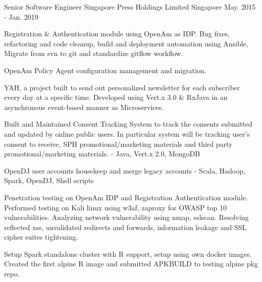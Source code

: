 \begin{cventries}
  \cventry
      {Senior Software Engineer} %
      {Singapore Press Holdings Limited} %
      {Singapore} %
      {May. 2015 - Jan. 2019} %
      { %
        \begin{cvitems}
          \item {Registration \& Authentication module using OpenAm as IDP. Bug fixes, refactoring and code cleanup, build and deployment automation using Ansible, Migrate from svn to git and standardize gitflow workflow.}
          \item {OpenAm Policy Agent configuration management and migration.}
          \item {YAH, a project built to send out personalized newsletter for each subscriber every day at a specific time. Developed using Vert.x 3.0 \& RxJava in an asynchronous event-based manner as Microservices.}
          \item {Built and Maintained Consent Tracking System to track the consents submitted and updated by online public users. In particular system will be tracking user’s consent to receive, SPH promotional/marketing materials and third party promotional/marketing materials. - Java, Vert.x 2.0, MongoDB}
          \item {OpenDJ user accounts housekeep and merge legacy accounts - Scala, Hadoop, Spark, OpenDJ, Shell scripts }
          \item {Penetration testing on OpenAm IDP and Registration Authentication module. Performed testing on Kali linux using w3af, zaproxy for OWASP top 10 vulnerabilities. Analyzing network vulnerability using nmap, sslscan.  Resolving reflected xss, unvalidated redirects and forwards, information leakage and SSL cipher suites tightening.}
          \item {Setup Spark standalone cluster with R support, setup using own docker images. Created the first alpine R image and submitted APKBUILD to testing alpine pkg repo.}
        \end{cvitems}
      }



\end{cventries}
